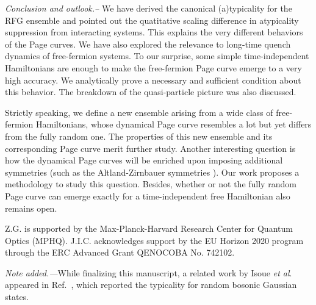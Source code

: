 \documentclass[twocolumn,english,prl,aps,superscriptaddress,amsmath,amssymb,floatfix]{revtex4-2}
\begin{document}
\emph{Conclusion and outlook.--}%
We have derived the canonical
(a)typicality for the RFG ensemble %
and pointed out the quatitative %
scaling difference in atypicality suppression %
from %
interacting systems. This %
explains the very different behaviors of the Page curves. %
We have also explored the relevance to long-time quench dynamics of %
free-fermion systems. %
To our surprise, some simple time-independent
Hamiltonians are enough to 
make %
the free-fermion Page curve %
emerge to a very high accuracy. 
We %
analytically prove a necessary and sufficient condition about this behavior. The breakdown %
of the quasi-particle picture was also discussed.

Strictly speaking, we define a new %
ensemble arising from %
a wide class of free-fermion Hamiltonians, whose dynamical Page curve resembles a lot but yet differs from %
the fully random one. %
The properties of this new ensemble and its corresponding Page curve %
merit further study. Another interesting question is how the %
dynamical Page curves will be enriched upon imposing %
additional symmetries (such as the Altland-Zirnbauer symmetries \cite{Altland1997}). %
Our work proposes a methodology to study this question. Besides, whether
or not the fully random Page curve can emerge exactly for a time-independent free Hamiltonian %
also remains open.

Z.G. is supported by the Max-Planck-Harvard Research Center for Quantum Optics (MPHQ). J.I.C. acknowledges support by the EU Horizon 2020 program through the ERC Advanced Grant QENOCOBA No. 742102.

\emph{Note added.---}While finalizing this manuscript, a related
work by Isoue \emph{et al}. appeared in Ref.~\cite{Iosue2022}, which reported the typicality for random bosonic Gaussian states.






\end{document}
